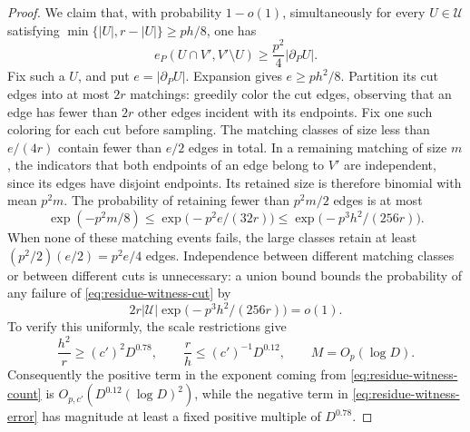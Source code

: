 \begin{proof}
We claim that, with probability $1-o(1)$, simultaneously for every
$U\in\mathcal U$ satisfying
$\min\{|U|,r-|U|\}\ge ph/8$, one has
\begin{equation}\label{eq:residue-witness-cut}
  e_P(U\cap V',V'\setminus U)
     \ge\frac{p^2}{4}|\partial_P U|.
\end{equation}
Fix such a $U$, and put $e=|\partial_P U|$.  Expansion gives
$e\ge ph^2/8$.  Partition its cut edges into at most $2r$ matchings:
greedily color the cut edges, observing that an edge has fewer than
$2r$ other edges incident with its endpoints.  Fix one such coloring
for each cut before sampling.  The matching classes of size less than
$e/(4r)$ contain fewer than $e/2$ edges in total.  In a remaining
matching of size $m$, the indicators that both endpoints of an edge
belong to $V'$ are independent, since its edges have disjoint
endpoints.  Its retained size is therefore binomial with mean $p^2m$.
The probability of retaining fewer than $p^2m/2$ edges is at most
\[
  \exp(-p^2m/8)
  \le\exp\bigl(-p^2e/(32r)\bigr)
  \le\exp\bigl(-p^3h^2/(256r)\bigr).
\]
When none of these matching events fails, the large classes retain
at least $(p^2/2)(e/2)=p^2e/4$ edges.  Independence between different
matching classes or between different cuts is unnecessary: a union
bound bounds the probability of any failure of
\eqref{eq:residue-witness-cut} by
\begin{equation}\label{eq:residue-witness-error}
  2r|\mathcal U|\exp\bigl(-p^3h^2/(256r)\bigr)=o(1).
\end{equation}
To verify this uniformly, the scale restrictions give
\[
  \frac{h^2}{r}\ge(c')^2D^{0.78},\qquad
  \frac rh\le(c')^{-1}D^{0.12},\qquad
  M=O_p(\log D).
\]
Consequently the positive term in the exponent coming from
\eqref{eq:residue-witness-count} is
$O_{p,c'}(D^{0.12}(\log D)^2)$, while the negative term in
\eqref{eq:residue-witness-error} has magnitude at least a fixed
positive multiple of $D^{0.78}$.


\end{proof}
